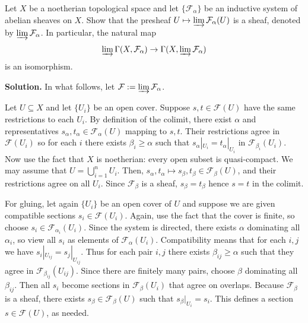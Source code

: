 \documentclass{template}
\begin{document}
\begin{problem}[Exercise 4]
    Let $X$ be a noetherian topological space and let $\{\mathcal{F}_{\alpha}\}$ be an inductive system of abelian sheaves on $X$.
    Show that the presheaf $U \mapsto \varinjlim \mathcal{F}_{\alpha}(U)$ is a sheaf, denoted by $\varinjlim \mathcal{F}_{\alpha}$.
    In particular, the natural map
    \begin{equation*}
        \varinjlim \Gamma(X, \mathcal{F}_{\alpha}) \to \Gamma(X, \varinjlim \mathcal{F}_{\alpha})
    \end{equation*}
    is an isomorphism.
\end{problem}

\textbf{Solution.} In what follows, let $\mathcal{F} := \varinjlim \mathcal{F}_{\alpha}$.

Let $U \subseteq X$ and let $\{U_i\}$ be an open cover.
Suppose $s,t \in \mathcal{F}(U)$ have the same restrictions to each $U_i$.
By definition of the colimit, there exist $\alpha$ and representatives
$s_{\alpha},t_{\alpha} \in \mathcal{F}_{\alpha}(U)$ mapping to $s,t$. Their restrictions
agree in $\mathcal{F}(U_i)$ so for each $i$ there exists $\beta_i \geq \alpha$ such that 
$s_{\alpha}|_{U_i} = t_{\alpha}|_{U_i}$ in $\mathcal{F}_{\beta_i}(U_i)$.
Now use the fact that $X$ is noetherian: every open subset is quasi-compact.
We may assume that $U = \bigcup_{i=1}^n U_i$. Then, $s_{\alpha},t_{\alpha} \mapsto s_{\beta},t_{\beta} \in \mathcal{F}_{\beta}(U)$,
and their restrictions agree on all $U_i$. Since $\mathcal{F}_{\beta}$ is a sheaf, $s_{\beta}=t_{\beta}$ hence $s=t$ in the colimit.

For gluing, let again $\{U_i\}$ be an open cover of $U$ and suppose we are given 
compatible sections $s_i \in \mathcal{F}(U_i)$. Again, use the fact that the cover 
is finite, so choose $s_i \in \mathcal{F}_{\alpha_i}(U_i)$. Since the system is 
directed, there exists $\alpha$ dominating all $\alpha_i$, so view all $s_i$
as elements of $\mathcal{F}_{\alpha}(U_i)$. Compatibility means that for 
each $i,j$ we have $s_i|_{U_{ij}} = s_j|_{U_{ij}}$. Thus for each pair 
$i,j$ there exists $\beta_{ij} \geq \alpha$ such that they agree in $\mathcal{F}_{\beta_{ij}}(U_{ij})$.
Since there are finitely many pairs, choose $\beta$ dominating all $\beta_{ij}$.
Then all $s_i$ become sections in $\mathcal{F}_{\beta}(U_i)$ that agree on overlaps.
Because $\mathcal{F}_{\beta}$ is a sheaf, there exists $s_{\beta} \in \mathcal{F}_{\beta}(U)$
such that $s_{\beta}|_{U_i} = s_i$. This defines a section $s \in \mathcal{F}(U)$, as needed.
\end{document}
